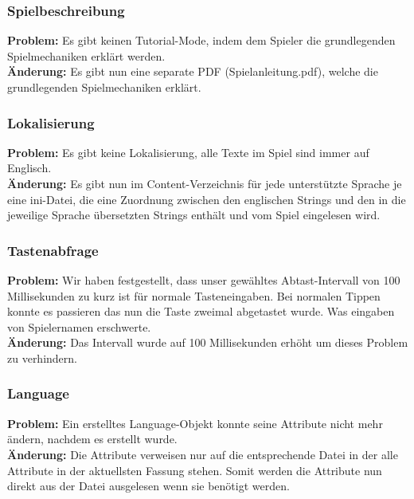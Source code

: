 
\subsubsection*{Spielbeschreibung}

\textbf{Problem:}
Es gibt keinen Tutorial-Mode, indem dem Spieler die grundlegenden Spielmechaniken erklärt werden.\\

\textbf{Änderung:} Es gibt nun eine separate PDF (\glqq Spielanleitung.pdf\grqq), welche die grundlegenden Spielmechaniken erklärt.\\



\subsubsection*{Lokalisierung}

\textbf{Problem:}
Es gibt keine Lokalisierung, alle Texte im Spiel sind immer auf Englisch.\\

\textbf{Änderung:} Es gibt nun im Content-Verzeichnis für jede unterstützte Sprache je eine ini-Datei, die eine Zuordnung zwischen den englischen Strings und den in die jeweilige Sprache übersetzten Strings enthält und vom Spiel eingelesen wird.\\



\subsubsection*{Tastenabfrage}
\textbf{Problem:}
Wir haben festgestellt, dass unser gewähltes Abtast-Intervall von 100 Millisekunden zu kurz ist für normale Tasteneingaben. Bei normalen Tippen konnte es passieren das nun die Taste zweimal abgetastet wurde. Was eingaben von Spielernamen erschwerte.\\

\textbf{Änderung:} Das Intervall wurde auf 100 Millisekunden erhöht um dieses Problem zu verhindern.\\



\subsubsection*{Language}
\textbf{Problem:}
Ein erstelltes Language-Objekt konnte seine Attribute nicht mehr ändern, nachdem es erstellt wurde.\\
\textbf{Änderung:} Die Attribute verweisen nur auf die entsprechende Datei in der alle Attribute in der aktuellsten Fassung stehen. Somit werden die Attribute nun direkt aus der Datei ausgelesen wenn sie benötigt werden.


